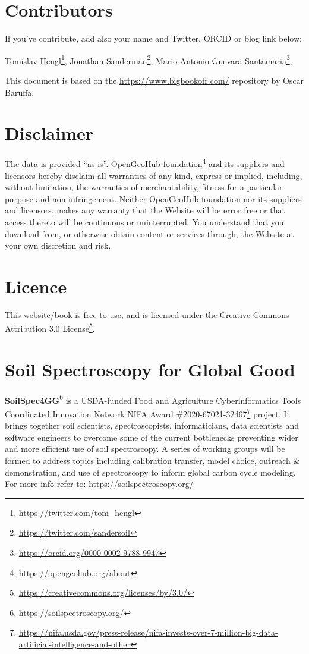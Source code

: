 \documentclass[
  graybox,natbib,nospthms]{svmono}
\renewcommand{\href}[2]{#2 (\url{#1})}
\renewcommand{\href}[2]{#2\footnote{\url{#1}}}
\begin{document}
\hypertarget{contributors}{%
\section{Contributors}\label{contributors}}

If you've contribute, add also your name and Twitter, ORCID or blog link
below:

\href{https://twitter.com/tom_hengl}{Tomislav Hengl}, \href{https://twitter.com/sandersoil}{Jonathan Sanderman}, \href{https://orcid.org/0000-0002-9788-9947}{Mario Antonio Guevara
Santamaria},

This document is based on the \url{https://www.bigbookofr.com/} repository
by Oscar Baruffa.

\hypertarget{disclaimer}{%
\section{Disclaimer}\label{disclaimer}}

The data is provided ``as is''. \href{https://opengeohub.org/about}{OpenGeoHub foundation} and its suppliers and licensors hereby disclaim all warranties of any kind, express or implied, including, without limitation, the warranties of merchantability, fitness for a particular purpose and non-infringement. Neither OpenGeoHub foundation nor its suppliers and licensors, makes any warranty that the Website will be error free or that access thereto will be continuous or uninterrupted. You understand that you download from, or otherwise obtain content or services through, the Website at your own discretion and risk.

\hypertarget{licence}{%
\section{Licence}\label{licence}}

This website/book is free to use, and is licensed under the \href{https://creativecommons.org/licenses/by/3.0/}{Creative
Commons Attribution 3.0
License}.

\hypertarget{soil-spectroscopy-for-global-good}{%
\section{Soil Spectroscopy for Global Good}\label{soil-spectroscopy-for-global-good}}

\href{https://soilspectroscopy.org/}{\textbf{SoilSpec4GG}} is a USDA-funded \href{https://nifa.usda.gov/press-release/nifa-invests-over-7-million-big-data-artificial-intelligence-and-other}{Food and Agriculture Cyberinformatics
Tools Coordinated Innovation Network NIFA Award \#2020-67021-32467} project. It brings together soil
scientists, spectroscopists, informaticians, data scientists and
software engineers to overcome some of the current bottlenecks
preventing wider and more efficient use of soil spectroscopy. A series
of working groups will be formed to address topics including calibration
transfer, model choice, outreach \& demonstration, and use of
spectroscopy to inform global carbon cycle modeling. For more info refer
to: \url{https://soilspectroscopy.org/}
\end{document}
